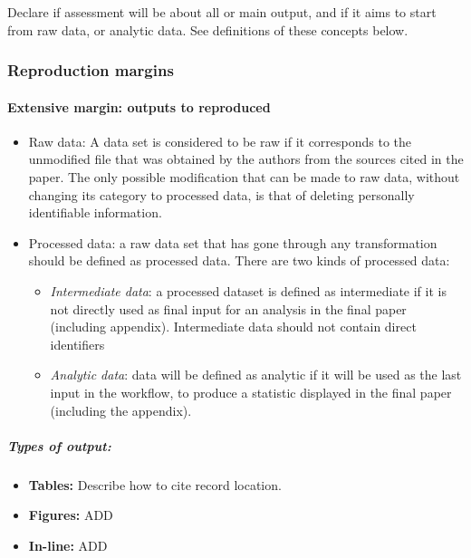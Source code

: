 \documentclass[]{book}
\providecommand{\tightlist}{%
  \setlength{\itemsep}{0pt}\setlength{\parskip}{0pt}}
\let\oldparagraph\paragraph
\renewcommand{\paragraph}[1]{\oldparagraph{#1}\mbox{}}
\let\oldsubparagraph\subparagraph
\renewcommand{\subparagraph}[1]{\oldsubparagraph{#1}\mbox{}}
\begin{document}
Declare if assessment will be about all or main output, and if it aims to start from raw data, or analytic data. See definitions of these concepts below.

\hypertarget{reproduction-margins}{%
\subsubsection{Reproduction margins}\label{reproduction-margins}}

\hypertarget{outputs}{%
\paragraph{Extensive margin: outputs to reproduced}\label{outputs}}

\begin{itemize}
\item
  Raw data: A data set is considered to be raw if it corresponds to the unmodified file that was obtained by the authors from the sources cited in the paper. The only possible modification that can be made to raw data, without changing its category to processed data, is that of deleting personally identifiable information.
\item
  Processed data: a raw data set that has gone through any transformation should be defined as processed data. There are two kinds of processed data:

  \begin{itemize}
  \tightlist
  \item
    \emph{Intermediate data}: a processed dataset is defined as intermediate if it is not directly used as final input for an analysis in the final paper (including appendix). Intermediate data should not contain direct identifiers\\
  \item
    \emph{Analytic data}: data will be defined as analytic if it will be used as the last input in the workflow, to produce a statistic displayed in the final paper (including the appendix).
  \end{itemize}
\end{itemize}

\hypertarget{types-of-output}{%
\subparagraph{Types of output:}\label{types-of-output}}

\begin{itemize}
\tightlist
\item
  \textbf{Tables:} Describe how to cite record location.
\item
  \textbf{Figures:} ADD\\
\item
  \textbf{In-line:} ADD
\end{itemize}
\end{document}

